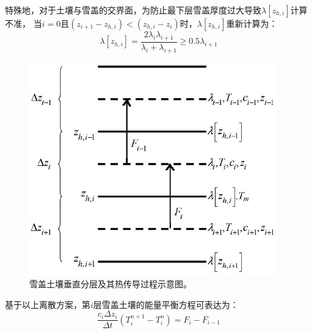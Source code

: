 特殊地，对于土壤与雪盖的交界面，为防止最下层雪盖厚度过大导致$\lambda\left[z_{h,i}\right]$计算不准，
当$i=0$且$\left(z_{i+1}-z_{h,i}\right)<\left(z_{h,i}-z_i\right)$时，$\lambda\left[z_{h,i}\right]$重新计算为：
\begin{equation}
\lambda\left[z_{h,i}\right]=\frac{2 \lambda_{i} \lambda_{i+1}}{\lambda_{i}+\lambda_{i+1}} \geq 0.5 \lambda_{i+1}
\end{equation}
{
\begin{figure}[]
\centering
\includegraphics{Figures/雪盖土壤热力过程/雪盖土壤垂直分层及其热传导过程示意图.png}
\caption{雪盖土壤垂直分层及其热传导过程示意图。}
\label{fig:雪盖土壤垂直分层及其热传导过程示意图}
\end{figure}
}


基于以上离散方案，第$ i $层雪盖土壤的能量平衡方程可表达为：
\begin{equation}
\frac{c_{i} \Delta z_{i}}{\Delta t}\left(T_{i}^{n+1}-T_{i}^{n}\right)=F_{i}-F_{i-1}
\end{equation}

